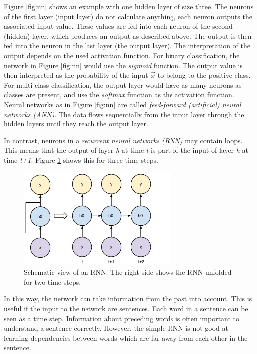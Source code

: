 Figure \ref{fig:nn} shows an example with one hidden layer of size three. The neurons of the first layer (input layer) do not calculate anything, each neuron outputs the associated input value. These values are fed into each neuron of the second (hidden) layer, which produces an output as described above. The output is then fed into the neuron in the last layer (the output layer). The interpretation of the output depends on the used activation function. For binary classification, the network in Figure \ref{fig:nn} would use the \emph{sigmoid} function. The output value is then interpreted as the probability of the input $\vec{x}$ to belong to the positive class. For multi-class classification, the output layer would have as many neurons as classes are present, and use the \emph{softmax} function as the activation function. Neural networks as in Figure \ref{fig:nn} are called \emph{feed-forward (artificial) neural networks (ANN)}. The data flows sequentially from the input layer through the hidden layers until they reach the output layer. 

In contrast, neurons in a \emph{recurrent neural networks (RNN)} may contain loops. This means that the output of layer \emph{h} at time \emph{t} is part of the input of layer \emph{h} at time \emph{t+1}. Figure \ref{fig:rnnschema} shows this for three time steps.


\begin{figure}[ht]
\centering
	\includegraphics[width=0.7\textwidth]{images/rnn_schema}
	\caption{Schematic view of an RNN. The right side shows the RNN unfolded for two time steps.}
		\label{fig:rnnschema}
\end{figure}

In this way, the network can take information from the past into account. This is useful if the input to the network are sentences. Each word in a sentence can be seen as a time step. Information about preceding words is often important to understand a sentence correctly. However, the simple RNN is not good at learning dependencies between words which are far away from each other in the sentence.

